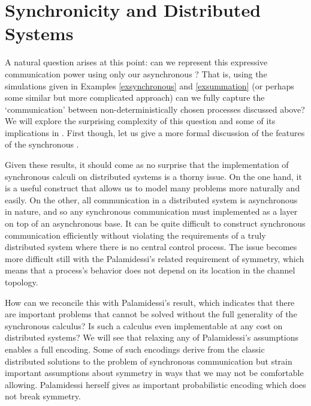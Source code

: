 \chapter{Synchronicity and Distributed Systems}\label{sync_and_dist_sys}
A natural question arises at this point: can we represent this expressive communication power using only our asynchronous \picalc?  That is, using the simulations given in Examples \ref{exsynchronous} and \ref{exsummation} (or perhaps some similar but more complicated approach) can we fully capture the `communication' between non-deterministically chosen processes discussed above?  We will explore the surprising complexity of this question and some of its implications in .  
First though, let us give a more formal discussion of the features of the synchronous \picalc. 

Given these results, it should come as no surprise that the implementation of synchronous calculi on distributed systems is a thorny issue.  
On the one hand, it is a useful construct that allows us to model many problems more naturally and easily.  
On the other, all communication in a distributed system is asynchronous in nature, and so any synchronous communication must implemented as a layer on top of an asynchronous base.  
It can be quite difficult to construct synchronous communication efficiently without violating the requirements of a truly distributed system where there is no central control process.  
The issue becomes more difficult still with the Palamidessi's related requirement of symmetry, which means that a process's behavior does not depend on its location in the channel topology. 


How can we reconcile this with Palamidessi's result, which indicates that there are important problems that cannot be solved without the full generality of the synchronous calculus?  Is such a calculus even implementable at any cost on distributed systems?  We will see that relaxing any of Palamidessi's assumptions enables a full encoding.  
Some of such encodings derive from the classic distributed solutions to the problem of synchronous communication but strain important assumptions about symmetry in ways that we may not be comfortable allowing.  
Palamidessi herself gives as important probabilistic encoding \cite{palam01} which does not break symmetry.

